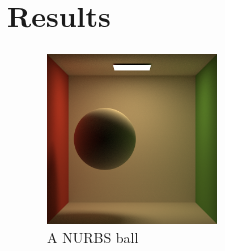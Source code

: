 \documentclass[acmtog]{acmart}
\begin{document}
\section{Results}


\begin{figure}[H]
	\centering
	\includegraphics[width=0.4\textwidth]{results/result600.png}
	\caption{A NURBS ball}
	\label{fig:result1}
\end{figure}
\end{document}

